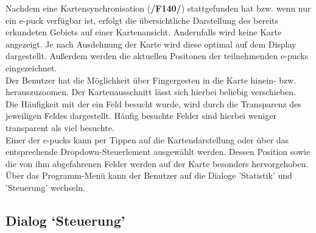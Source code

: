 \documentclass[10pt,a4paper]{article}
\begin{document}
			Nachdem eine Kartensynchronisation (\textbf{/F140/}) stattgefunden hat bzw. wenn nur ein e-puck verfügbar ist, erfolgt die
			übersichtliche Darstellung des bereits erkundeten Gebiets auf einer Kartenansicht. Andernfalls wird keine Karte angezeigt.
			Je nach Ausdehnung der Karte wird diese optimal auf dem Display dargestellt. Außerdem werden die aktuellen Positonen der
			teilnehmenden e-pucks eingezeichnet. \\	
			Der Benutzer hat die Möglichkeit über Fingergesten in die Karte hinein- bzw. herauszuzoomen. Der Kartenausschnitt lässt sich
			hierbei beliebig verschieben. \\		
			Die Häufigkeit mit der ein Feld besucht wurde, wird durch die Transparenz des jeweiligen Feldes dargestellt. Häufig besuchte
			Felder sind hierbei weniger transparent als viel besuchte. \\
			Einer der e-pucks kann per Tippen auf die Kartendarstellung oder über das entsprechende Dropdown-Steuerlement ausgewählt
			werden. Dessen Position sowie die von ihm abgefahrenen Felder werden auf der Karte besonders hervorgehoben.\\
			Über das Programm-Menü kann der Benutzer auf die Dialoge 'Statistik' und 'Steuerung' wechseln.
			\subsection{Dialog `Steuerung'}
			
\end{document}
